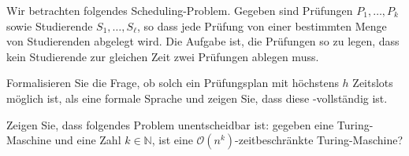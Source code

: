 \documentclass[german]{latteachCD}[2017/03/28]
\begin{document}
\begin{exercise}
  Wir betrachten folgendes Scheduling-Problem.  Gegeben sind Prüfungen $P_{1},
  \ldots, P_{k}$ sowie Studierende $S_{1}, \ldots, S_{\ell}$, so dass jede
  Prüfung von einer bestimmten Menge von Studierenden abgelegt wird.  Die
  Aufgabe ist, die Prüfungen so zu legen, dass kein Studierende zur gleichen
  Zeit zwei Prüfungen ablegen muss.

  Formalisieren Sie die Frage, ob solch ein Prüfungsplan mit höchstens $h$
  Zeitslots möglich ist, als eine formale Sprache und zeigen Sie, dass diese
  \NP-vollständig ist.
\end{exercise}

\begin{exercise}
  Zeigen Sie, dass folgendes Problem unentscheidbar ist: gegeben eine
  Turing-Maschine  und eine Zahl $k \in \mathbb N$, ist  eine
  $\mathcal{O}(n^{k})$-zeitbeschränkte Turing-Maschine?
\end{exercise}

\end{document}
